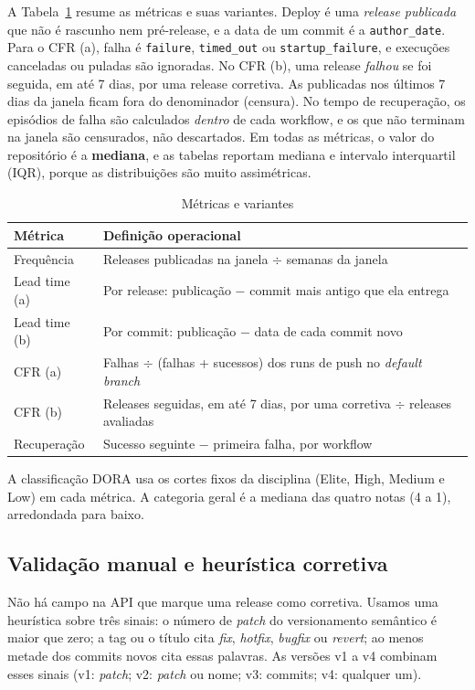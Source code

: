 \documentclass[12pt]{article}
\begin{document}
A Tabela~\ref{tab:def} resume as métricas e suas variantes. Deploy é uma
\emph{release publicada} que não é rascunho nem pré-release, e a data de um
commit é a \texttt{author\_date}. Para o CFR (a), falha é \texttt{failure},
\texttt{timed\_out} ou \texttt{startup\_failure}, e execuções canceladas ou
puladas são ignoradas. No CFR (b), uma release \emph{falhou} se foi seguida,
em até 7 dias, por uma release corretiva. As publicadas nos últimos 7 dias da
janela ficam fora do denominador (censura). No tempo de recuperação, os
episódios de falha são calculados \emph{dentro} de cada workflow, e os que não
terminam na janela são censurados, não descartados. Em todas as métricas, o
valor do repositório é a \textbf{mediana}, e as tabelas reportam mediana e
intervalo interquartil (IQR), porque as distribuições são muito assimétricas.

\begin{table}[ht]
\centering
\caption{Métricas e variantes}
\label{tab:def}
\small
\begin{tabular}{p{2.3cm}p{9.7cm}}
\toprule
Métrica & Definição operacional \\
\midrule
Frequência & Releases publicadas na janela $\div$ semanas da janela \\
Lead time (a) & Por release: publicação $-$ commit mais antigo que ela entrega \\
Lead time (b) & Por commit: publicação $-$ data de cada commit novo \\
CFR (a) & Falhas $\div$ (falhas + sucessos) dos runs de push no \emph{default branch} \\
CFR (b) & Releases seguidas, em até 7 dias, por uma corretiva $\div$ releases avaliadas \\
Recuperação & Sucesso seguinte $-$ primeira falha, por workflow \\
\bottomrule
\end{tabular}
\end{table}

A classificação DORA usa os cortes fixos da disciplina (Elite, High, Medium e
Low) em cada métrica. A categoria geral é a mediana das quatro notas (4 a 1),
arredondada para baixo.

\subsection{Validação manual e heurística corretiva}

Não há campo na API que marque uma release como corretiva. Usamos uma
heurística sobre três sinais: o número de \emph{patch} do versionamento
semântico \cite{semver} é maior que zero; a tag ou o título cita
\emph{fix}, \emph{hotfix}, \emph{bugfix} ou \emph{revert}; ao menos metade dos
commits novos cita essas palavras. As versões v1 a v4 combinam esses sinais
(v1: \emph{patch}; v2: \emph{patch} ou nome; v3: commits; v4: qualquer um).
\end{document}

